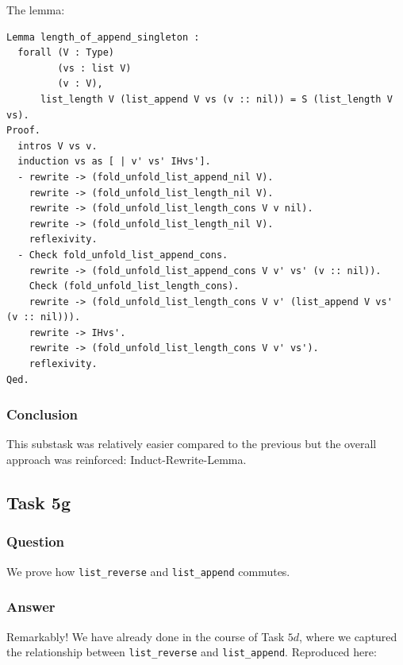 \documentclass{article}
\begin{document}
The lemma:

\begin{lstlisting}
Lemma length_of_append_singleton : 
  forall (V : Type)
         (vs : list V)
         (v : V),
      list_length V (list_append V vs (v :: nil)) = S (list_length V vs).
Proof.
  intros V vs v.
  induction vs as [ | v' vs' IHvs'].
  - rewrite -> (fold_unfold_list_append_nil V). 
    rewrite -> (fold_unfold_list_length_nil V).
    rewrite -> (fold_unfold_list_length_cons V v nil).
    rewrite -> (fold_unfold_list_length_nil V).
    reflexivity.
  - Check fold_unfold_list_append_cons.
    rewrite -> (fold_unfold_list_append_cons V v' vs' (v :: nil)).
    Check (fold_unfold_list_length_cons).
    rewrite -> (fold_unfold_list_length_cons V v' (list_append V vs' (v :: nil))). 
    rewrite -> IHvs'.
    rewrite -> (fold_unfold_list_length_cons V v' vs').
    reflexivity.
Qed.
\end{lstlisting}

\subsubsection{Conclusion}
This substask was relatively easier compared to the previous but the overall approach was reinforced: Induct-Rewrite-Lemma.

\subsection{Task 5g}

\subsubsection{Question}
We prove how \texttt{list\_reverse} and \texttt{list\_append} commutes.

\subsubsection{Answer}
Remarkably! We have already done in the course of Task $5d$, where we captured the relationship between \texttt{list\_reverse} and \texttt{list\_append}. Reproduced here:
\end{document}
